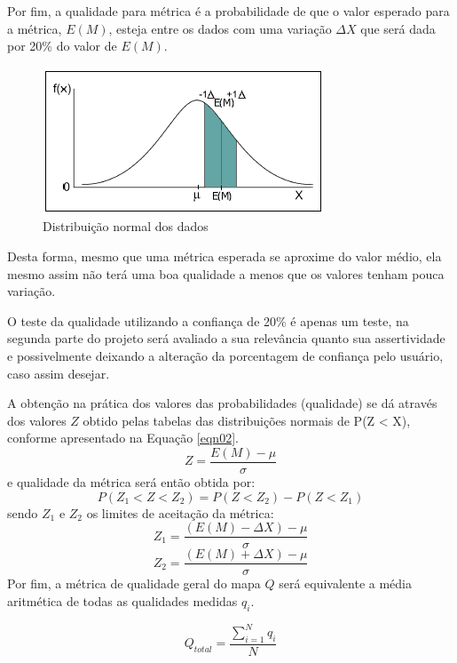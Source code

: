Por fim, a qualidade para métrica é a probabilidade de que o valor esperado para a métrica, $E(M)$, esteja entre os dados com uma variação $\Delta X$ que será dada por 20\% do valor de $E(M)$.

\begin{figure}[h]
	\centering
	\label{fig16}
		\includegraphics[keepaspectratio=true,scale=0.7]{figuras/fig16-normal2.png}
	\caption{Distribuição normal dos dados}
\end{figure} 

Desta forma, mesmo que uma métrica esperada se aproxime do valor médio, ela mesmo assim não terá uma boa qualidade a menos que os valores tenham pouca variação.

O teste da qualidade utilizando a confiança de 20\% é apenas um teste, na segunda parte do projeto será avaliado a sua relevância quanto sua assertividade e possivelmente deixando a alteração da porcentagem de confiança pelo usuário, caso assim desejar. 

A obtenção na prática dos valores das probabilidades (qualidade) se dá através dos valores $Z$ obtido pelas tabelas das distribuições normais de P(Z < X), conforme apresentado na Equação \ref{eqn02}.
\begin{equation}
\label{eqn02}
	Z = \frac{E(M) - \mu}{\sigma}
\end{equation}
e qualidade  da métrica será então obtida por:
\begin{equation}
\label{eqn03}
	P(Z_1 < Z < Z_2) = P(Z < Z_2) - P(Z < Z_1)
\end{equation}
sendo $Z_1$ e $Z_2$ os limites de aceitação da métrica:
\begin{equation}
\label{eqn04}
	Z_1 = \frac{(E(M) - \Delta X) - \mu}{\sigma}
\end{equation}
\begin{equation}
\label{eqn05}
	Z_2 = \frac{(E(M) + \Delta X) - \mu}{\sigma}
\end{equation}
Por fim, a métrica de qualidade geral do mapa $Q$ será equivalente a média aritmética de todas as qualidades medidas $q_i$. 

\begin{equation}
\label{eqn04}
	Q_{total} = \frac{\sum_{i=1}^{N} q_i}{N}
\end{equation}

